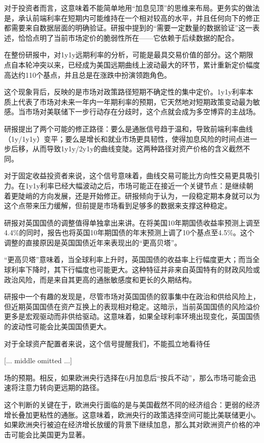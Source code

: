 \documentclass[11pt]{ctexart}
\begin{document}
对于投资者而言，这意味着不能简单地用“加息见顶”的思维来布局。更务实的做法是，承认前端利率在短期内可能维持在一个相对较高的水平，并且任何向下的修正都需要来自数据层面的明确验证。研报中提到的“需要一定数量的数据验证”这一表述，恰恰点明了当前市场定价的脆弱性所在——它依赖于后续数据的配合。

在整份研报中，对1y1y远期利率的分析，可能是最具交易价值的部分。这个期限点自本轮冲突以来，已经成为美国远期曲线上波动最大的环节，累计重新定价幅度高达约110个基点，并且总是在涨跌中扮演领跑角色。

这个现象背后，反映的是市场对政策路径短期不确定性的集中定价。1y1y利率本质上代表了市场对未来一年内一年期利率的预期，它天然地对短期政策变动最为敏感。当市场对美联储下一步行动存在分歧时，这个点就会成为多空博弈的主战场。

研报提出了两个可能的修正路径：要么是通胀信号趋于温和，导致前端利率曲线（1y/1y1y）变平；要么是增长和就业市场更具韧性，使得加息风险的时间点进一步后移，从而导致1y1y/2y1y的曲线变陡。这两种路径对资产价格的含义截然不同。

对于固定收益投资者来说，这个信号意味着，曲线交易可能比方向性交易更具吸引力。在1y1y利率已经大幅波动之后，市场可能正在接近一个关键节点：是继续朝着更陡峭的方向发展，还是开始修正。研报倾向于认为，一段稳定期本身就可以为这个点带来压力缓解，但前提是市场看到足够多的数据来支撑这种稳定。

研报对英国国债的调整值得单独拿出来讲。在将美国10年期国债收益率预测上调至4.4\%的同时，报告也将英国10年期国债的年末预测上调了10个基点至4.5\%。这个调整的直接原因是英国国债近年来表现出的“更高贝塔”。

“更高贝塔”意味着，当全球利率上升时，英国国债的收益率上行幅度更大；而当全球利率下降时，其下行幅度也可能更大。这种特征并非来自英国特有的财政风险或政治风险，而是来自其更高的通胀敏感度和更长的久期结构。

研报中一个有趣的发现是，尽管市场对英国国债的叙事集中在政治和供给风险上，但近期英国国债在资产互换上的表现相对稳定。这暗示，当前英国国债的风险溢价更多是宏观驱动而非供给驱动。这意味着，如果全球利率环境出现变化，英国国债的波动性可能会比美国国债更大。

对于全球资产配置者来说，这个信号提醒我们，不能孤立地看待任

[... middle omitted ...]

场的预期。相反，如果欧洲央行选择在6月加息后“按兵不动”，那么市场可能会迅速将注意力转向更远期的路径。

这个判断的关键在于，欧洲央行面临的是与美国截然不同的经济组合：更弱的经济增长叠加更粘性的通胀。这意味着，欧洲央行的政策选择空间可能比美联储更小。如果欧洲央行被迫在经济增长放缓的背景下继续加息，那么其对欧洲资产价格的冲击可能会比美国更为显著。
\end{document}
